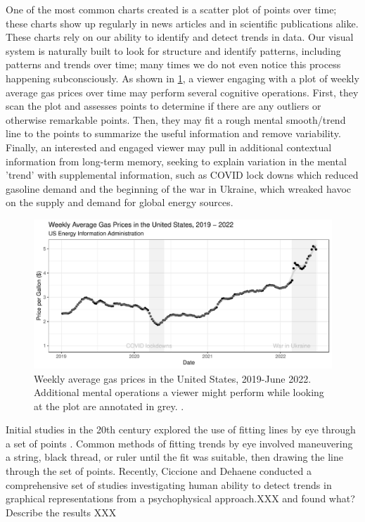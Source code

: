 \documentclass[10pt]{article}
\begin{document}
{\textcolor{RedOrange}{One of the most common charts created is a scatter plot of points over time; these charts show up regularly in news articles and in scientific publications alike.
These charts rely on our}} ability to identify and detect trends in
data. Our visual system is naturally built to look for structure and
identify patterns,
{\textcolor{RedOrange}{including patterns and trends over time; many times we do not even notice this process happening subconsciously}}.
{\textcolor{RedOrange}{As shown in \cref{fig:gas-prices}, a viewer engaging with a plot of weekly average gas prices over time may perform several cognitive operations. First, they scan the plot and assesses points to determine if there are any outliers or otherwise remarkable points. Then, they may fit a rough mental smooth/trend line to the points to summarize the useful information and remove variability. Finally, an interested and engaged viewer may pull in additional contextual information from long-term memory, seeking to explain variation in the mental 'trend' with supplemental information, such as COVID lock downs which reduced gasoline demand and the beginning of the war in Ukraine, which wreaked havoc on the supply and demand for global energy sources.}}

\begin{figure}

{\centering \includegraphics[width=\columnwidth]{./images/gas-prices-1} 

}

\caption{Weekly average gas prices in the United States, 2019-June 2022. Additional mental operations a viewer might perform while looking at the plot are annotated in grey. \cite{usenergyinformationadministrationWeeklyAllGrades2022}.}\label{fig:gas-prices}
\end{figure}

Initial studies in the 20th century explored the use of fitting lines by
eye through a set of points
\cite{finney1951subjective,mosteller1981eye}. Common methods of fitting
trends by eye involved maneuvering a string, black thread, or ruler
until the fit was suitable, then drawing the line through the set of
points. Recently, Ciccione and Dehaene 
conducted a comprehensive set of studies investigating human ability to
detect trends in graphical representations from a psychophysical
approach.{\textcolor{RedOrange}{XXX and found what? Describe the results XXX}}
\end{document}
